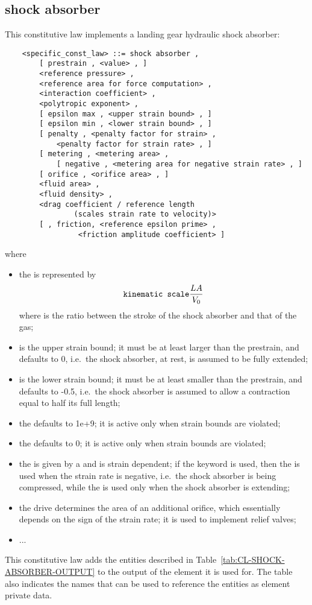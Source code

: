 \subsection{shock absorber}\label{sec:CL-SHOCK-ABSORBER}
This constitutive law implements a landing gear hydraulic shock absorber:
\begin{verbatim}
    <specific_const_law> ::= shock absorber ,
        [ prestrain , <value> , ]
        <reference pressure> ,
        <reference area for force computation> ,
        <interaction coefficient> ,
        <polytropic exponent> ,
        [ epsilon max , <upper strain bound> , ]
        [ epsilon min , <lower strain bound> , ]
        [ penalty , <penalty factor for strain> , 
            <penalty factor for strain rate> , ]
        [ metering , <metering area> ,
            [ negative , <metering area for negative strain rate> , ]
        [ orifice , <orifice area> , ]
        <fluid area> ,
        <fluid density> ,
        <drag coefficient / reference length
                (scales strain rate to velocity)>
        [ , friction, <reference epsilon prime> ,
                 <friction amplitude coefficient> ]
\end{verbatim}
where
\begin{itemize}
\item the  is represented by
\begin{displaymath}
	\texttt{kinematic scale} \frac{L A}{V_0}
\end{displaymath}
where  is the ratio between the stroke
of the shock absorber and that of the gas;
\item {} is the upper strain bound; it must be
at least larger than the prestrain, and defaults to 0,
i.e.\ the shock absorber, at rest, is assumed to be fully
extended;
\item {} is the lower strain bound; it must be
at least smaller than the prestrain, and defaults to -0.5, 
i.e.\ the shock absorber is assumed to allow a contraction
equal to half its full length;
\item the  defaults to 1e+9;
it is active only when strain bounds are violated;
\item the  defaults to 0;
it is active only when strain bounds are violated;
\item the  is given by a  
and is strain dependent; if the keyword  is used, 
then the  is used
when the strain rate is negative, i.e.\ the shock absorber
is being compressed, while the  is used only
when the shock absorber is extending;
\item the  drive determines the area of an
additional orifice, which essentially depends on the sign
of the strain rate; it is used to implement relief valves;
\item ...
\end{itemize}
This constitutive law adds the entities described
in Table~\ref{tab:CL-SHOCK-ABSORBER-OUTPUT} to the output of the
element it is used for.
The table also indicates the names that can be used to reference
the entities as element private data.

